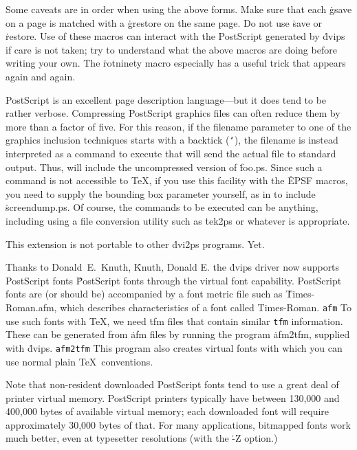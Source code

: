 Some caveats are in order when using the above forms.  Make sure that
each \.{gsave} on a page is matched with a \.{grestore} on the same
page.  Do not use \.{save} or \.{restore}.  Use of these macros can
interact with the PostScript generated by \.{dvips} if care is not
taken; try to understand what the above macros are doing before
writing your own.  The \.{\ttbackslash rotninety} macro especially has
a useful trick that appears again and again.


PostScript is an excellent page description language---but it does
tend to be rather verbose.  Compressing PostScript graphics files can
often reduce them by more than a factor of five.  For this reason,
if the filename parameter to one of the graphics inclusion techniques
starts with a backtick ({\tt`}), the filename is instead interpreted
as a command to execute that will send the actual file to standard
output.  Thus,
\noindent
will include the uncompressed version of \.{foo.ps}.  Since such a
command is not accessible to \TeX, if you use this facility with
the \.{EPSF} macros, you need to supply the bounding box parameter
yourself, as in
\noindent
to include \.{screendump.ps}.  Of course, the commands to be executed can
be anything, including using a file conversion utility such as \.{tek2ps}
or whatever is appropriate.

This extension is not portable to other \.{dvi2ps} programs.  Yet.


Thanks to Donald~E.~Knuth,
\^{Knuth, Donald E.}
the \.{dvips} driver now supports PostScript fonts
\^{PostScript fonts}
through the virtual font capability.
PostScript fonts are (or should be) accompanied by a font metric file
such as \.{Times-Roman.afm},
which describes characteristics of a font called Times-Roman.
\^{{\tt afm}}
To use such fonts with \TeX, we need \.{tfm} files that contain similar
\^{{\tt tfm}}
information. These can be generated from \.{afm} files
by running the program \.{afm2tfm}, supplied with \.{dvips}.
\^{{\tt afm2tfm}}
This program also creates virtual fonts with which you can use normal
plain \TeX\ conventions.

Note that non-resident downloaded PostScript fonts tend to use a
great deal of printer virtual memory.  PostScript printers typically
have between 130,000 and 400,000 bytes of available virtual memory;
each downloaded font will require approximately 30,000 bytes of
that.  For many applications, bitmapped fonts work much better,
even at typesetter resolutions (with the \.{-Z} option.)

